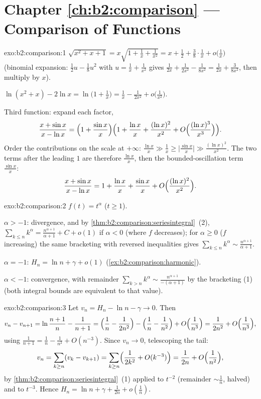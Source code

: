 \section*{Chapter \ref{ch:b2:comparison} --- Comparison of Functions}

\begin{solution}{exo:b2:comparison:1}
$\sqrt{x^2 + x + 1} = x\sqrt{1 + \tfrac1x + \tfrac{1}{x^2}} = x +
\frac12 + \frac38\cdot\frac1x + o\bigl(\frac1x\bigr)$ (binomial
expansion: $\frac12 u - \frac18 u^2$ with $u = \frac1x +
\frac{1}{x^2}$ gives $\frac{1}{2x} + \frac{1}{2x^2} -
\frac{1}{8x^2} = \frac{1}{2x} + \frac{3}{8x^2}$, then multiply by
$x$).

$\ln(x^2 + x) - 2\ln x = \ln\bigl(1 + \tfrac1x\bigr) = \frac1x -
\frac{1}{2x^2} + o\bigl(\frac{1}{x^2}\bigr)$.

Third function: expand each factor,
\[
\frac{x + \sin x}{x - \ln x}
= \Bigl(1 + \frac{\sin x}{x}\Bigr)
\Bigl(1 + \frac{\ln x}{x} + \frac{(\ln x)^2}{x^2} +
O\Bigl(\frac{(\ln x)^3}{x^3}\Bigr)\Bigr).
\]
Order the contributions on the scale at $+\infty$: $\frac{\ln x}{x}
\gg \frac{1}{x} \geq \bigl|\frac{\sin x}{x}\bigr| \gg \frac{(\ln
x)^2}{x^2}$. The two terms after the leading $1$ are therefore
$\frac{\ln x}{x}$, then the bounded-oscillation term $\frac{\sin
x}{x}$:
\[
\frac{x + \sin x}{x - \ln x}
= 1 + \frac{\ln x}{x} + \frac{\sin x}{x}
+ O\Bigl(\frac{(\ln x)^2}{x^2}\Bigr).
\]
\end{solution}

\begin{solution}{exo:b2:comparison:2}
$f(t) = t^\alpha$ ($t \geq 1$).

$\alpha > -1$: divergence, and by
\cref{thm:b2:comparison:seriesintegral}~(2), $\sum_{k\leq n}
k^\alpha = \frac{n^{\alpha+1}}{\alpha+1} + C + o(1)$ if $\alpha <
0$ (where $f$ decreases); for $\alpha \geq 0$ ($f$ increasing) the
same bracketing with reversed inequalities gives $\sum_{k \leq n}
k^\alpha \sim \frac{n^{\alpha + 1}}{\alpha + 1}$.

$\alpha = -1$: $H_n = \ln n + \gamma + o(1)$
(\cref{ex:b2:comparison:harmonic}).

$\alpha < -1$: convergence, with remainder $\sum_{k > n} k^\alpha
\sim \frac{n^{\alpha+1}}{-(\alpha+1)}$ by the bracketing (1) (both
integral bounds are equivalent to that value).
\end{solution}

\begin{solution}{exo:b2:comparison:3}
Let $v_n = H_n - \ln n - \gamma \to 0$. Then
\[
v_n - v_{n+1} = \ln\frac{n+1}{n} - \frac{1}{n+1}
= \Bigl(\frac1n - \frac{1}{2n^2}\Bigr) - \Bigl(\frac1n -
\frac{1}{n^2}\Bigr) + O\Bigl(\frac{1}{n^3}\Bigr)
= \frac{1}{2n^2} + O\Bigl(\frac{1}{n^3}\Bigr),
\]
using $\frac{1}{n+1} = \frac1n - \frac{1}{n^2} + O(n^{-3})$. Since
$v_n \to 0$, telescoping the tail:
\[
v_n = \sum_{k \geq n} (v_k - v_{k+1})
= \sum_{k\geq n} \Bigl(\frac{1}{2k^2} + O(k^{-3})\Bigr)
= \frac{1}{2n} + O\Bigl(\frac{1}{n^2}\Bigr),
\]
by \cref{thm:b2:comparison:seriesintegral}~(1) applied to $t^{-2}$
(remainder $\sim \frac1n$, halved) and to $t^{-3}$. Hence $H_n =
\ln n + \gamma + \frac{1}{2n} + o(\frac1n)$.
\end{solution}

